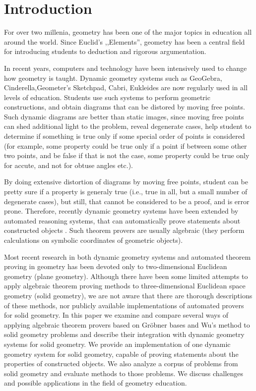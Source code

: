 \documentclass{aicom2e}
\begin{document}
\section{Introduction}
For over two millenia, geometry has been one of the major topics in
education all around the world. Since Euclid's ,,Elements'', geometry
has been a central field for introducing students to deduction and
rigorous argumentation. 

In recent years, computers and technology have been intensively used
to change how geometry is taught. Dynamic geometry systems such as
GeoGebra, Cinderella,Geometer's Sketchpad, Cabri, Eukleides
\cite{geogebra,cinderella} %
are now regularly used in all levels of education. Students use such
systems to perform geometric constructions, and obtain diagrams that
can be distored by moving free points. Such dynamic diagrams are
better than static images, since moving free points can shed
additional light to the problem, reveal degenerate cases, help student
to determine if something is true only if some special order of points
is considered (for example, some property could be true only if a
point if between some other two points, and be false if that is not
the case, some property could be true only for accute, and not for
obtuse angles etc.).

By doing extensive distortion of diagrams by moving free points,
student can be pretty sure if a property is generaly true (i.e., true
in all, but a small number of degenerate cases), but still, that
cannot be considered to be a proof, and is error prone. Therefore,
recently dynamic geometry systems have been extended by automated
reasoning systems, that can automatically prove statements about
constructed objects \cite{geogebra-provers}. Such theorem provers are
usually algebraic (they perform calculations on symbolic coordinates
of geometric objects).



Most recent research in both dynamic geometry systems and automated
theorem proving in geometry has been devoted only to two-dimensional
Euclidean geometry (plane geometry). Although there have been some
limited attempts to apply algebraic theorem proving methods to
three-dimensional Euclidean space geometry (solid geometry), we are
not aware that there are thorough descriptions of these methods, nor
publicly available implementations of automated provers for solid
geometry. In this paper we examine and compare several ways of
applying algebraic theorem provers based on Gr\"obner bases and Wu's
method to solid geometry problems and describe their integration with
dynamic geometry systems for solid geometry. We provide an
implementation of one dynamic geometry system for solid geometry,
capable of proving statements about the properties of constructed
objects. We also analyze a corpus of problems from solid geometry and
evaluate methods to those problems. We discuss challenges and possible
applications in the field of geometry education.
\end{document}
